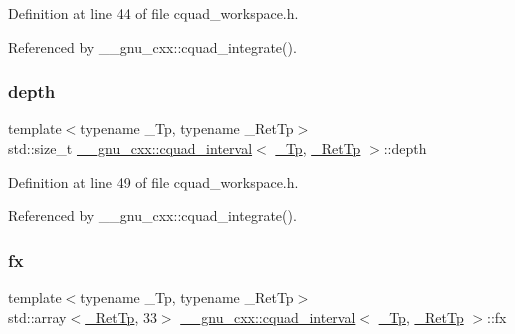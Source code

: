 Definition at line 44 of file cquad\+\_\+workspace.\+h.



Referenced by \+\_\+\+\_\+gnu\+\_\+cxx\+::cquad\+\_\+integrate().

\mbox{\label{struct____gnu__cxx_1_1cquad__interval_af4a321c6e64f7de6ab0cbf4ebd4381a7}} 
\subsubsection{\texorpdfstring{depth}{depth}}
{\footnotesize\ttfamily template$<$typename \+\_\+\+Tp, typename \+\_\+\+Ret\+Tp$>$ \\
std\+::size\+\_\+t \hyperlink{struct____gnu__cxx_1_1cquad__interval}{\+\_\+\+\_\+gnu\+\_\+cxx\+::cquad\+\_\+interval}$<$ \hyperlink{namespace____gnu__cxx_a3b19a9c800ca194374ef9172290f7d79}{\+\_\+\+Tp}, \hyperlink{namespace____gnu__cxx_a886e03ece3d53ff7fa6c098a40f93fa5}{\+\_\+\+Ret\+Tp} $>$\+::depth}



Definition at line 49 of file cquad\+\_\+workspace.\+h.



Referenced by \+\_\+\+\_\+gnu\+\_\+cxx\+::cquad\+\_\+integrate().

\mbox{\label{struct____gnu__cxx_1_1cquad__interval_ab3c4ae7b9f1ad8fe99f385e388514fae}} 
\subsubsection{\texorpdfstring{fx}{fx}}
{\footnotesize\ttfamily template$<$typename \+\_\+\+Tp, typename \+\_\+\+Ret\+Tp$>$ \\
std\+::array$<$\hyperlink{namespace____gnu__cxx_a886e03ece3d53ff7fa6c098a40f93fa5}{\+\_\+\+Ret\+Tp}, 33$>$ \hyperlink{struct____gnu__cxx_1_1cquad__interval}{\+\_\+\+\_\+gnu\+\_\+cxx\+::cquad\+\_\+interval}$<$ \hyperlink{namespace____gnu__cxx_a3b19a9c800ca194374ef9172290f7d79}{\+\_\+\+Tp}, \hyperlink{namespace____gnu__cxx_a886e03ece3d53ff7fa6c098a40f93fa5}{\+\_\+\+Ret\+Tp} $>$\+::fx}




